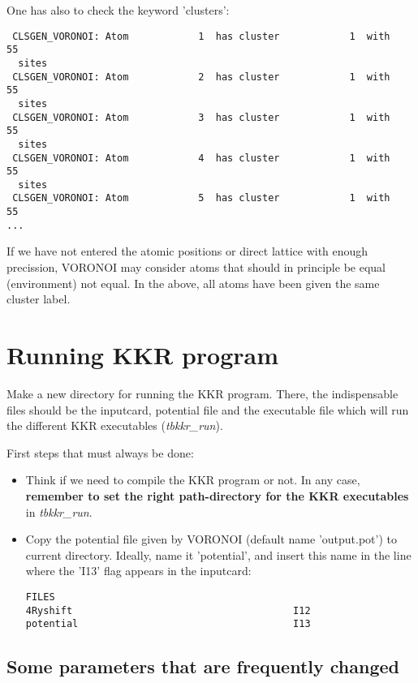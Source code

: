 \documentclass[a4paper,10pt,fullpage]{report}
\begin{document}
One has also to check the keyword 'clusters':
\begin{verbatim}
 CLSGEN_VORONOI: Atom            1  has cluster            1  with           55
  sites
 CLSGEN_VORONOI: Atom            2  has cluster            1  with           55
  sites
 CLSGEN_VORONOI: Atom            3  has cluster            1  with           55
  sites
 CLSGEN_VORONOI: Atom            4  has cluster            1  with           55
  sites
 CLSGEN_VORONOI: Atom            5  has cluster            1  with           55
...
\end{verbatim}
If we have not entered the atomic positions or direct lattice with enough precission, 
VORONOI may consider atoms that should in principle be equal (environment) 
not equal. In the above, all atoms have been given the same cluster label.

\section{Running KKR program}
\label{sec:run-kkr}

Make a new directory for running the KKR program. There, the indispensable files
should be the inputcard, potential file and the executable file which
will run the different KKR executables (\textit{tbkkr\_run}). 

First steps that must always be done:

\begin{itemize}
\item Think if we need to compile the KKR program or not. In any case, \textbf{remember
to set the right path-directory 
for the KKR executables} in \textit{tbkkr\_run}.

\item Copy the potential file given by VORONOI 
(default name 'output.pot') to current directory. Ideally, 
name it 'potential', and insert this name in the line where the 'I13' flag appears
in the inputcard:
\begin{verbatim}
FILES
4Ryshift                                      I12
potential                                     I13
\end{verbatim} 

\end{itemize}


\subsection{Some parameters that are frequently changed}
\label{subsec:parameters}
\end{document}
